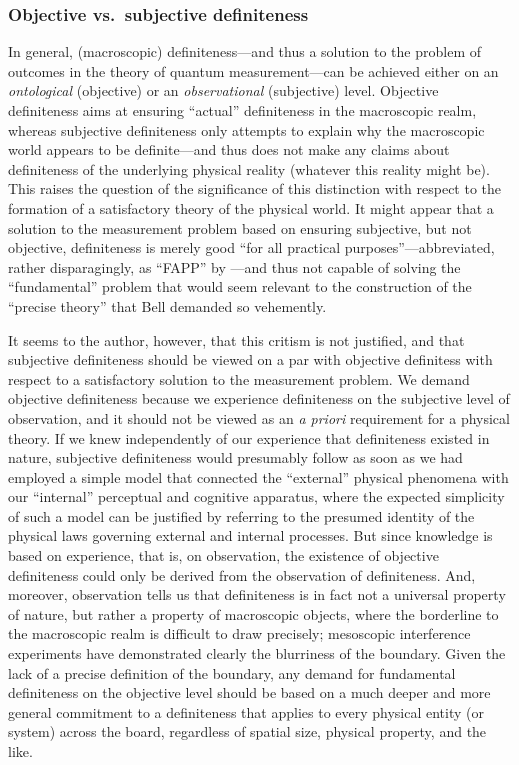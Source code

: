 \documentclass[rmp,aps,amsmath,amsfonts,noshowkeys,noshowpacs,12pt]{revtex4}
\newcommand{\vs}{vs.\ }
\begin{document}
\subsubsection{\label{sec:objsubj}Objective \vs subjective definiteness}

In general, (macroscopic) definiteness---and thus a solution to the
problem of outcomes in the theory of quantum measurement---can be
achieved either on an \emph{ontological} (objective) or an
\emph{observational} (subjective) level.  Objective definiteness aims
at ensuring ``actual'' definiteness in the macroscopic realm, whereas
subjective definiteness only attempts to explain why the macroscopic
world appears to be definite---and thus does not make any
claims about definiteness of the underlying physical reality (whatever
this reality might be). This raises the question of the significance
of this distinction with respect to the formation of a satisfactory
theory of the physical world. It might appear that a solution to the
measurement problem based on ensuring subjective, but not objective,
definiteness is merely good ``for all practical
purposes''---abbreviated, rather disparagingly, as ``FAPP'' by
\citet{Bell:1990:po}---and thus not capable of solving the
``fundamental'' problem that would seem relevant to the construction
of the ``precise theory'' that Bell demanded so vehemently.

It seems to the author, however, that this critism is not justified,
and that subjective definiteness should be viewed on a par with
objective definitess with respect to a satisfactory solution to the
measurement problem. We demand objective definiteness because we
experience definiteness on the subjective level of observation, and it
should not be viewed as an \emph{a priori} requirement for a physical
theory.  If we knew independently of our experience that definiteness
existed in nature, subjective definiteness would presumably follow as
soon as we had employed a simple model that connected the ``external''
physical phenomena with our ``internal'' perceptual and cognitive
apparatus, where the expected simplicity of such a model can be
justified by referring to the presumed identity of the physical laws
governing external and internal processes.  But since knowledge is
based on experience, that is, on observation, the existence of
objective definiteness could only be derived from the observation of
definiteness. And, moreover, observation tells us that definiteness is
in fact not a universal property of nature, but rather a property of
macroscopic objects, where the borderline to the macroscopic realm is
difficult to draw precisely; mesoscopic interference experiments have
demonstrated clearly the blurriness of the boundary. Given the lack of
a precise definition of the boundary, any demand for fundamental
definiteness on the objective level should be based on a much deeper
and more general commitment to a definiteness that applies to
every physical entity (or system) across the board, regardless
of spatial size, physical property, and the like.
\end{document}
